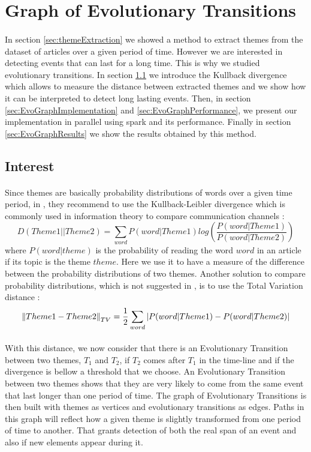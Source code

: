 \section{Graph of Evolutionary Transitions}
\paragraph{}
In section \ref{sec:themeExtraction} we showed a method to extract themes from the dataset of articles over a given period of time. However we are interested in detecting events that can last for a long time. This is why we studied evolutionary transitions. In section \ref{sec:EvoGraphInterest} we introduce the Kullback divergence which allows to measure the distance between extracted themes and we show how it can be interpreted to detect long lasting events. Then, in section \ref{sec:EvoGraphImplementation} and \ref{sec:EvoGraphPerformance}, we present our implementation in parallel using spark and its performance. Finally in section \ref{sec:EvoGraphResults} we show the results obtained by this method.

\subsection{Interest}
\label{sec:EvoGraphInterest}

\paragraph{}
Since themes are basically probability distributions of words over a given time period, in \cite{kdd05-ttm}, they recommend to use the Kullback-Leibler divergence which is commonly used in information theory to compare communication channels \cite{kullback1997information} :\[ D(Theme1 || Theme2) = \sum_{word} P(word|Theme1) log(\frac{P(word|Theme1)}{P(word|Theme2)})\]where $P(word|theme)$ is the probability of reading the word $word$ in an article if its topic is the theme $theme$. Here we use it to have a measure of the difference between the probability distributions of two themes. Another solution to compare probability distributions, which is not suggested in \cite{kdd05-ttm}, is to use the Total Variation distance \cite{INSR419} :\[ \left\lVert Theme1 - Theme2\right\rVert_{TV} = \frac{1}{2} \sum_{word} |P(word|Theme1) - P(word|Theme2)|\]

\paragraph{}
With this distance, we now consider that there is an Evolutionary Transition between two themes, $T_1$ and $T_2$, if $T_2$ comes after $T_1$ in the time-line and if the divergence is bellow a threshold that we choose. An Evolutionary Transition between two themes shows that they are very likely to come from the same event that last longer than one period of time. The graph of Evolutionary Transitions is then built with themes as vertices and evolutionary transitions as edges. Paths in this graph will reflect how a given theme is slightly transformed from one period of time to another. That grants detection of both the real span of an event and also if new elements appear during it.

